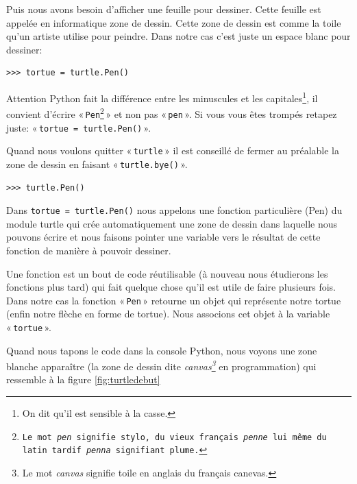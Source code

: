 Puis nous avons besoin d'afficher une feuille pour dessiner. Cette feuille est appelée en informatique zone de dessin. Cette zone de dessin est comme la toile qu'un artiste utilise pour peindre. Dans notre cas c'est juste un espace blanc pour dessiner:

\begin{Verbatim}[frame=single,rulecolor=\color{mbleu}, label=à taper]
>>> tortue = turtle.Pen()
\end{Verbatim}

Attention Python fait la différence entre les minuscules et les capitales\footnote{On dit qu'il est sensible à la casse.}, il convient d'écrire « \texttt{Pen\footnote{Le mot \emph{pen} signifie stylo, du vieux français \emph{penne} lui même du latin tardif \emph{penna} signifiant plume.
}} »  et non pas « \texttt{pen} ». Si vous vous êtes trompés retapez juste: « \texttt{tortue = turtle.Pen()} ».


Quand nous voulons quitter « \texttt{turtle} » il est conseillé de fermer au préalable la zone de dessin en faisant « \texttt{turtle.bye()} ».

\begin{Verbatim}[frame=single,rulecolor=\color{mbleu}, label=à taper]
>>> turtle.Pen()
\end{Verbatim}


Dans \verb+tortue = turtle.Pen()+ nous appelons une fonction particulière (Pen) du module turtle qui crée automatiquement une zone de dessin dans laquelle nous pouvons écrire et nous faisons pointer une variable vers le résultat de cette fonction de manière à pouvoir dessiner.

Une fonction est un bout de code réutilisable (à nouveau nous étudierons  les fonctions plus tard) qui fait quelque chose qu'il est utile de faire plusieurs fois. Dans notre cas la fonction « \texttt{Pen} » retourne un objet qui 
représente notre tortue (enfin notre flèche en forme de tortue). Nous associons cet objet à la variable « \texttt{tortue} ».

Quand nous tapons le code dans la console Python, nous voyons une zone blanche apparaître (la zone de dessin dite \emph{canvas\footnote{Le mot \emph{canvas} signifie toile en anglais du français canevas.}} en programmation) qui ressemble à la figure \ref{fig:turtledebut}


